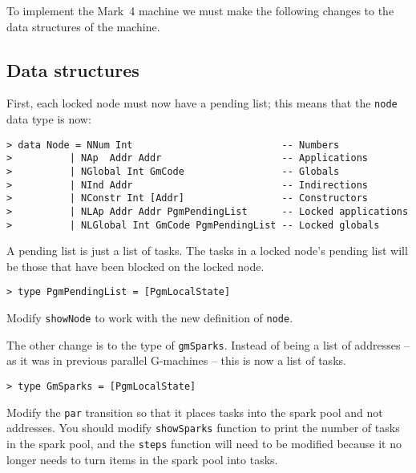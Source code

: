 To implement the Mark~4 machine we must make the following changes to
the data structures of the machine.

\subsection{Data structures}

First, each locked node must now have a pending list; this means that
the \mbox{\tt node} data type is now:

\begin{verbatim}
> data Node = NNum Int                          -- Numbers
>          | NAp  Addr Addr                     -- Applications
>          | NGlobal Int GmCode                 -- Globals
>          | NInd Addr                          -- Indirections
>          | NConstr Int [Addr]                 -- Constructors
>          | NLAp Addr Addr PgmPendingList      -- Locked applications
>          | NLGlobal Int GmCode PgmPendingList -- Locked globals
\end{verbatim}
%
%
%
%
%
%
%
A pending list is just a list of tasks. The tasks in a locked node's
pending list will be those that have been blocked on the locked node.
\begin{verbatim}
> type PgmPendingList = [PgmLocalState]
\end{verbatim}
%
\begin{exercise}\label{pgm:X:4:showNode}
Modify \mbox{\tt showNode} to work with the new definition of \mbox{\tt node}.
\end{exercise}

The other change is to the type of \mbox{\tt gmSparks}. Instead of being a list of
addresses -- as it was in previous parallel G-machines -- this is now
a list of tasks.
\begin{verbatim}
> type GmSparks = [PgmLocalState]
\end{verbatim}
%
\begin{exercise}\label{pgm:X:showSparks}
Modify the \mbox{\tt par} transition so that it places tasks into the spark
pool and not addresses. You should modify \mbox{\tt showSparks} function to
print the number of tasks in the spark pool, and the \mbox{\tt steps} function
will need to be modified because it no longer needs to turn items in
the spark pool into tasks.
\end{exercise}


